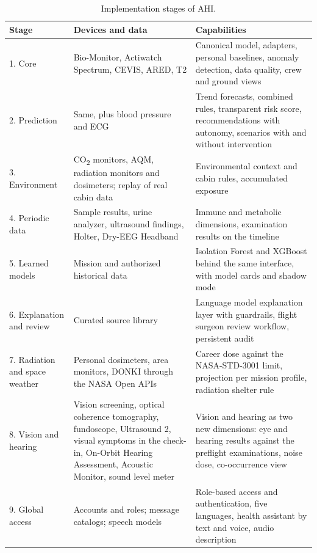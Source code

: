 \begin{table}[htbp]
\centering
\vspace{0.8em}
\caption{Implementation stages of AHI.}
\label{tab:features}
\footnotesize
\begin{tabular}{p{2.6cm}p{5.6cm}p{5.8cm}}
\hline
\textbf{Stage} & \textbf{Devices and data} & \textbf{Capabilities} \\
\hline
1. Core & Bio-Monitor, Actiwatch Spectrum, CEVIS, ARED, T2 & Canonical model, adapters, personal baselines, anomaly detection, data quality, crew and ground views \\
2. Prediction & Same, plus blood pressure and ECG & Trend forecasts, combined rules, transparent risk score, recommendations with autonomy, scenarios with and without intervention \\
3. Environment & CO\textsubscript{2} monitors, AQM, radiation monitors and dosimeters; replay of real cabin data & Environmental context and cabin rules, accumulated exposure \\
4. Periodic data & Sample results, urine analyzer, ultrasound findings, Holter, Dry-EEG Headband & Immune and metabolic dimensions, examination results on the timeline \\
5. Learned models & Mission and authorized historical data & Isolation Forest and XGBoost behind the same interface, with model cards and shadow mode \\
6. Explanation and review & Curated source library & Language model explanation layer with guardrails, flight surgeon review workflow, persistent audit \\
7. Radiation and space weather & Personal dosimeters, area monitors, DONKI through the NASA Open APIs & Career dose against the NASA-STD-3001 limit, projection per mission profile, radiation shelter rule \\
8. Vision and hearing & Vision screening, optical coherence tomography, fundoscope, Ultrasound 2, visual symptoms in the check-in, On-Orbit Hearing Assessment, Acoustic Monitor, sound level meter & Vision and hearing as two new dimensions: eye and hearing results against the preflight examinations, noise dose, co-occurrence view \\
9. Global access & Accounts and roles; message catalogs; speech models & Role-based access and authentication, five languages, health assistant by text and voice, audio description \\
\hline
\end{tabular}
\vspace{1.2em}
\end{table}

